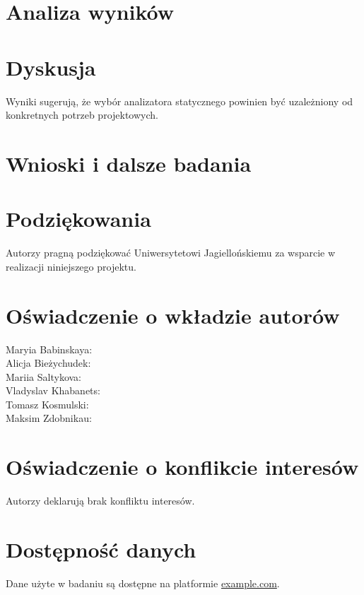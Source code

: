 \documentclass[a4paper,12pt]{article}
\begin{document}
\section{Analiza wyników}


\section{Dyskusja}
Wyniki sugerują, że wybór analizatora statycznego powinien być uzależniony od konkretnych potrzeb projektowych.

\section{Wnioski i dalsze badania}


\section*{Podziękowania}
Autorzy pragną podziękować Uniwersytetowi Jagiellońskiemu za wsparcie w realizacji niniejszego projektu.

\section*{Oświadczenie o wkładzie autorów}
Maryia Babinskaya: \\
Alicja Bieżychudek: \\
Mariia Saltykova: \\
Vladyslav Khabanets: \\
Tomasz Kosmulski: \\
Maksim Zdobnikau: \\

\section*{Oświadczenie o konflikcie interesów}
Autorzy deklarują brak konfliktu interesów.

\section*{Dostępność danych}
Dane użyte w badaniu są dostępne na platformie \href{https://example.com}{example.com}.



\end{document}
